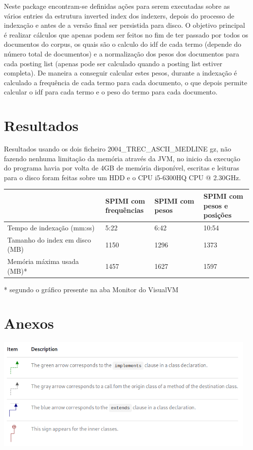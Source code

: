 \documentclass[12pt]{article}
\begin{document}
Neste package encontram-se definidas ações para serem executadas
sobre as vários entries da estrutura inverted index dos indexers,
depois do processo de indexação e antes de a versão final ser
persistida para disco. O objetivo principal é realizar cálculos
que apenas podem ser feitos no fim de ter passado por todos os
documentos do corpus, os quais são o calculo do idf de cada termo
(depende do número total de documentos) e a normalização dos pesos
dos documentos para cada posting list (apenas pode ser calculado
quando a posting list estiver completa). De maneira a conseguir
calcular estes pesos, durante a indexação é calculado a frequência
de cada termo para cada documento, o que depois permite calcular
o idf para cada termo e o peso do termo para cada documento.

\newpage

\section{Resultados}

Resultados usando os dois ficheiro 2004\_TREC\_ASCII\_MEDLINE gz,
não fazendo nenhuma limitação da memória através da JVM,  no
inicio da execução do programa havia por volta de 4GB de memória
disponível, escritas e leituras  para o disco foram feitas sobre
um HDD e o CPU i5-6300HQ CPU @ 2.30GHz.

\begin{tabular}{| p{0.4\linewidth} | p{0.2\linewidth} | p{0.2\linewidth} | p{0.2\linewidth} |}
        \hline
        & \bf SPIMI com frequências
        & \bf SPIMI com pesos
        & \bf SPIMI com pesos e posições\\
        \hline
        Tempo de indexação (mm:ss) & 5:22 & 6:42 & 10:54 \\
        \hline
        Tamanho do index em disco (MB) & 1150 & 1296 & 1373 \\
        \hline
        Memória máxima usada (MB)* & 1457 & 1627 & 1597 \\
    \hline
\end{tabular}

* segundo o gráfico presente na aba Monitor do VisualVM

\newpage

\section{Anexos}

\includegraphics[width=13cm]{arrow_legend.png}
\end{document}
